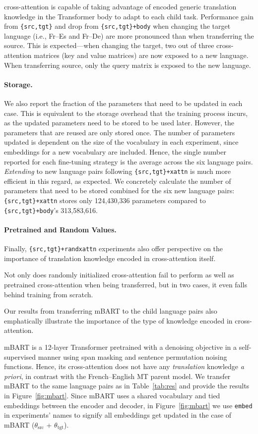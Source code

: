 cross-attention is capable of taking advantage of encoded generic translation knowledge in the Transformer body to adapt to each child task. Performance gain from \texttt{\{src,tgt\}} and drop from \texttt{\{src,tgt\}+body} when changing the target language (i.e., Fr--Es and Fr--De) are more pronounced than when transferring the source. This is expected---when changing the target, two out of three cross-attention matrices (key and value matrices) are now exposed to a new language. When transferring source, only the query matrix is exposed to the new language.

\paragraph{Storage.} We also report the fraction of the parameters that need to be updated in each case. This is equivalent to the storage overhead that the training process incurs, as the updated parameters need to be stored to be used later. However, the parameters that are reused are only stored once. The number of parameters updated is dependent on the size of the vocabulary in each experiment, since embeddings for a new vocabulary are included. Hence, the single number reported for each fine-tuning strategy is the average across the six language pairs. \textit{Extending} to new language pairs following \texttt{\{src,tgt\}+xattn} is much more efficient in this regard, as expected. We concretely calculate the number of parameters that need to be stored combined for the six new language pairs: \texttt{\{src,tgt\}+xattn} stores only 124,430,336 parameters compared to \texttt{\{src,tgt\}+body}'s 313,583,616.

\paragraph{Pretrained and Random Values.} Finally, \texttt{\{src,tgt\}+randxattn} experiments also offer perspective on the importance of translation knowledge encoded in cross-attention itself.

Not only does randomly initialized cross-attention fail to perform as well as pretrained cross-attention when being transferred, but in two cases, it even falls behind training from scratch.

Our results from transferring mBART \cite{liu-etal-2020-multilingual} to the child language pairs also emphatically illustrate the importance of the type of knowledge encoded in cross-attention. 

mBART is a 12-layer Transformer pretrained with a denoising objective in a self-supervised manner using span masking and sentence permutation noising functions. Hence, its cross-attention does not have any \textit{translation} knowledge \textit{a priori}, in contrast with the French--English MT parent model. We transfer mBART to the same language pairs as in Table~\ref{tab:res} and provide the results in Figure~\ref{fig:mbart}. Since mBART uses a shared vocabulary and tied embeddings between the encoder and decoder, in Figure~\ref{fig:mbart} we use \texttt{embed} in experiments' names to signify all embeddings get updated in the case of mBART ($\theta_{\text{src}}$ + $\theta_{\text{tgt}}$).

